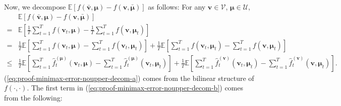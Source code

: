 \documentclass[12pt]{article}
\begin{document}
Now, we decompose $\mathbb{E}[f(\bar{\boldsymbol{v}},\boldsymbol{\mu}) - f(\boldsymbol{v},\bar{\boldsymbol{\mu}})]$ as follows: For any $\boldsymbol{v} \in \mathcal{V}$, $\boldsymbol{\mu} \in \mathcal{U}$,
\begin{subequations}
    \begin{align}
        & \mathbb{E} \left[ f(\bar{\boldsymbol{v}},\boldsymbol{\mu}) - f(\boldsymbol{v},\bar{\boldsymbol{\mu}})\right] \nonumber \\
        = & \mathbb{E} \left[\frac{1}{T} \sum_{t=1}^T f(\boldsymbol{v}_t,\boldsymbol{\mu}) - \frac{1}{T} \sum_{t=1}^T f(\boldsymbol{v},\boldsymbol{\mu}_t)\right] \label{eq:proof-minimax-error-noupper-decom-a} \\
        = & \frac{1}{T} \mathbb{E}\left [ \sum_{t=1}^T  f(\boldsymbol{v}_t,\boldsymbol{\mu}) -  \sum_{t=1}^T f(\boldsymbol{v}_t,\boldsymbol{\mu}_t)  \right]+ \frac{1}{T}\mathbb{E}\left [ \sum_{t=1}^T f(\boldsymbol{v}_t,\boldsymbol{\mu}_t)- \sum_{t=1}^T f(\boldsymbol{v},\boldsymbol{\mu}_t) \right] \nonumber \\
        \le & \frac{1}{T} \mathbb{E}\left [ \sum_{t=1}^T  \hat{f}^{(\boldsymbol{\mu})}_t(\boldsymbol{v}_t,\boldsymbol{\mu}) -  \sum_{t=1}^T \hat{f}^{(\boldsymbol{\mu})}_t(\boldsymbol{v}_t,\boldsymbol{\mu}_t)  \right] + \frac{1}{T}\mathbb{E}\left [ \sum_{t=1}^T \hat{f}^{(\boldsymbol{v})}_t(\boldsymbol{v}_t,\boldsymbol{\mu}_t)- \sum_{t=1}^T \hat{f}^{(\boldsymbol{v})}_t(\boldsymbol{v},\boldsymbol{\mu}_t) \right].\label{eq:proof-minimax-error-noupper-decom-b}
    \end{align}
    \label{eq:proof-minimax-error-noupper-decompose}
\end{subequations}
(\ref{eq:proof-minimax-error-noupper-decom-a}) comes from the bilinear structure of $f(\cdot,\cdot)$. The first term in (\ref{eq:proof-minimax-error-noupper-decom-b}) comes from the following:
\end{document}

